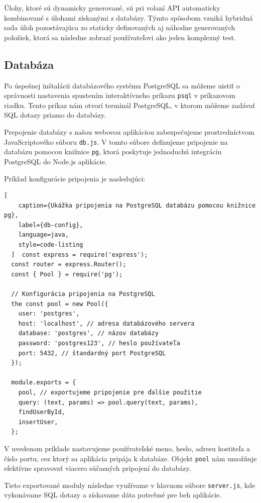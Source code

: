 Úlohy, ktoré sú dynamicky generované, sú pri volaní API automaticky kombinované s úlohami získanými z databázy.
 Týmto spôsobom vzniká hybridná sada úloh pozostávajúca zo staticky definovaných aj náhodne generovaných položiek, ktorá sa následne zobrazí používateľovi ako jeden komplexný test.
 
 \subsection{Databáza}
  Po úspešnej inštalácii databázového systému PostgreSQL sa môžeme uistiť o správnosti nastavenia spustením interaktívneho príkazu \texttt{psql} v príkazovom riadku.
   Tento príkaz nám otvorí terminál PostgreSQL, v ktorom môžeme zadávať SQL dotazy priamo do databázy.

  Prepojenie databázy s našou webovou aplikáciou zabezpečujeme prostredníctvom JavaScriptového súboru \texttt{db.js}.
   V tomto súbore definujeme pripojenie na databázu pomocou knižnice \texttt{pg}, ktorá poskytuje jednoduchú integráciu PostgreSQL do Node.js aplikácie.
  
  Príklad konfigurácie pripojenia je nasledujúci:
  
  \begin{lstlisting}[
    caption={Ukážka pripojenia na PostgreSQL databázu pomocou knižnice pg},
    label={db-config},
    language=java,
    style=code-listing
  ]  const express = require('express');
  const router = express.Router();
  const { Pool } = require('pg');
  
  // Konfigurácia pripojenia na PostgreSQL
  the const pool = new Pool({
    user: 'postgres',
    host: 'localhost', // adresa databázového servera
    database: 'postgres', // názov databázy
    password: 'postgres123', // heslo používateľa
    port: 5432, // štandardný port PostgreSQL
  });
  
  module.exports = {
    pool, // exportujeme pripojenie pre ďalšie použitie
    query: (text, params) => pool.query(text, params),
    findUserById,
    insertUser,
  };
  \end{lstlisting}
  
  V uvedenom príklade nastavujeme používateľské meno, heslo, adresu hostiteľa a číslo portu, cez ktorý sa aplikácia pripája k databáze.
   Objekt \texttt{pool} nám umožňuje efektívne spravovať viacero súčasných pripojení do databázy.
  
  Tieto exportované moduly následne využívame v hlavnom súbore \texttt{server.js}, kde vykonávame SQL dotazy a získavame dáta potrebné pre beh aplikácie.
  
